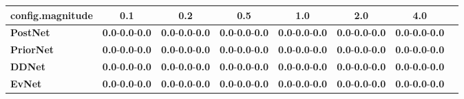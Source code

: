 \begin{tabular}{lccccccc}
\toprule
\textbf{config.magnitude} &                                     0.1 &                                     0.2 &                                     0.5 &                                     1.0 &                                     2.0 &                                     4.0 \\
\midrule
\textbf{PostNet } &  \textbf{0.0}-\textbf{0.0}-\textbf{0.0} &  \textbf{0.0}-\textbf{0.0}-\textbf{0.0} &  \textbf{0.0}-\textbf{0.0}-\textbf{0.0} &  \textbf{0.0}-\textbf{0.0}-\textbf{0.0} &  \textbf{0.0}-\textbf{0.0}-\textbf{0.0} &  \textbf{0.0}-\textbf{0.0}-\textbf{0.0} \\
\textbf{PriorNet} &  \textbf{0.0}-\textbf{0.0}-\textbf{0.0} &  \textbf{0.0}-\textbf{0.0}-\textbf{0.0} &  \textbf{0.0}-\textbf{0.0}-\textbf{0.0} &  \textbf{0.0}-\textbf{0.0}-\textbf{0.0} &  \textbf{0.0}-\textbf{0.0}-\textbf{0.0} &  \textbf{0.0}-\textbf{0.0}-\textbf{0.0} \\
\textbf{DDNet   } &  \textbf{0.0}-\textbf{0.0}-\textbf{0.0} &  \textbf{0.0}-\textbf{0.0}-\textbf{0.0} &  \textbf{0.0}-\textbf{0.0}-\textbf{0.0} &  \textbf{0.0}-\textbf{0.0}-\textbf{0.0} &  \textbf{0.0}-\textbf{0.0}-\textbf{0.0} &  \textbf{0.0}-\textbf{0.0}-\textbf{0.0} \\
\textbf{EvNet   } &  \textbf{0.0}-\textbf{0.0}-\textbf{0.0} &  \textbf{0.0}-\textbf{0.0}-\textbf{0.0} &  \textbf{0.0}-\textbf{0.0}-\textbf{0.0} &  \textbf{0.0}-\textbf{0.0}-\textbf{0.0} &  \textbf{0.0}-\textbf{0.0}-\textbf{0.0} &  \textbf{0.0}-\textbf{0.0}-\textbf{0.0} \\
\bottomrule
\end{tabular}
